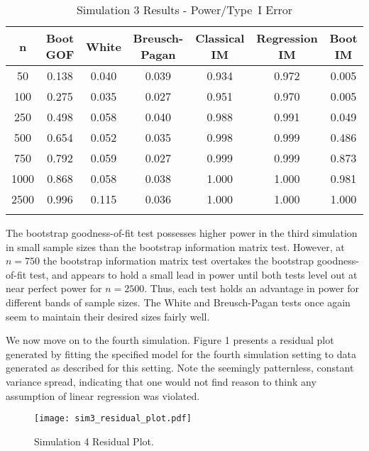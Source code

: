 \documentclass[sn-mathphys-ay]{sn-jnl}
\begin{document}
\begin{table}[h]
\caption{Simulation 3 Results - Power/Type~I Error}\label{sim3tab}%
\begin{tabular}{ c|c|c|c|c|c|c}
\toprule
n & Boot GOF & White & Breusch-Pagan & Classical IM & Regression IM & Boot IM \\
\midrule
50 & 0.138 & 0.040 & 0.039 & 0.934 & 0.972 & 0.005 \\
100 & 0.275 & 0.035 & 0.027 & 0.951 & 0.970 & 0.005 \\
250 & 0.498 & 0.058 & 0.040 & 0.988 & 0.991 & 0.049 \\
500 & 0.654 & 0.052 & 0.035 & 0.998 & 0.999 & 0.486 \\
750 & 0.792 & 0.059 & 0.027 & 0.999 & 0.999 & 0.873 \\
1000 & 0.868 & 0.058 & 0.038 & 1.000 & 1.000 & 0.981 \\
2500 & 0.996 & 0.115 & 0.036 & 1.000 & 1.000 & 1.000 \\
\botrule
\end{tabular}

\end{table}

The bootstrap goodness-of-fit test possesses higher power in the third simulation in small sample sizes than the bootstrap information matrix test. However, at $n = 750$ the bootstrap information matrix test
overtakes the bootstrap goodness-of-fit test, and appears to hold a small lead in power until both tests level out at near perfect power for $n = 2500$. Thus, each test holds an advantage in power for different bands of sample sizes.
The White and Breusch-Pagan tests once again seem to maintain their desired sizes fairly well.

We now move on to the fourth simulation. Figure 1 presents a residual plot generated by fitting the specified model for the fourth simulation setting to data generated as described for this setting.
Note the seemingly patternless, constant variance spread, indicating that one would not find reason to think any assumption of linear regression was violated. 

\begin{figure}[H]
\texttt{[image: sim3\_residual\_plot.pdf]}\par
\caption{Simulation 4 Residual Plot.}
\centering
\end{figure}
\end{document}
